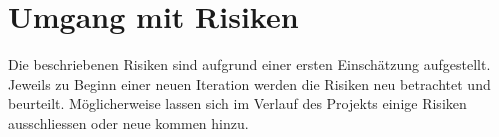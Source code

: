 \section{Umgang mit Risiken}
Die beschriebenen Risiken sind aufgrund einer ersten Einschätzung aufgestellt.
Jeweils zu Beginn einer neuen Iteration werden die Risiken neu betrachtet und beurteilt. Möglicherweise lassen sich im Verlauf des Projekts einige Risiken ausschliessen oder neue kommen hinzu.
